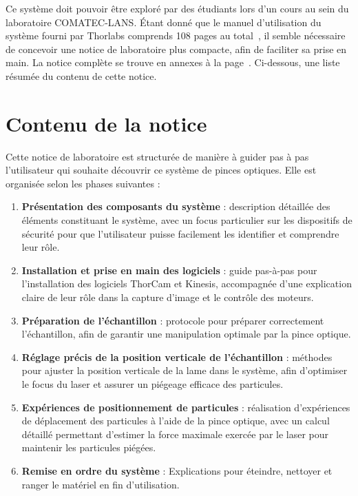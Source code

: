 Ce système doit pouvoir être exploré par des étudiants lors d'un cours au sein du laboratoire COMATEC-LANS. Étant donné que le manuel d'utilisation du système fourni par Thorlabs comprends 108 pages au total~\cite{manualPortableOpticalTweezers}, il semble nécessaire de concevoir une notice de laboratoire plus compacte, afin de faciliter sa prise en main. La notice complète se trouve en annexes à la page~\pageref{annexe:notice_labo}. Ci-dessous, une liste résumée du contenu de cette notice.
\section{Contenu de la notice}
Cette notice de laboratoire est structurée de manière à guider pas à pas l'utilisateur qui souhaite découvrir ce système de pinces optiques. Elle est organisée selon les phases suivantes :

\begin{enumerate}
    \item \textbf{Présentation des composants du système} : description détaillée des éléments constituant le système, avec un focus particulier sur les dispositifs de sécurité pour que l'utilisateur puisse facilement les identifier et comprendre leur rôle.

    \item \textbf{Installation et prise en main des logiciels} : guide pas-à-pas pour l'installation des logiciels ThorCam et Kinesis, accompagnée d'une explication claire de leur rôle dans la capture d'image et le contrôle des moteurs.

    \item \textbf{Préparation de l'échantillon} : protocole pour préparer correctement l'échantillon, afin de garantir une manipulation optimale par la pince optique.

    \item \textbf{Réglage précis de la position verticale de l'échantillon} : méthodes pour ajuster la position verticale de la lame dans le système, afin d'optimiser le focus du laser et assurer un piégeage efficace des particules.

    \item \textbf{Expériences de positionnement de particules} : réalisation d'expériences de déplacement des particules à l'aide de la pince optique, avec un calcul détaillé permettant d'estimer la force maximale exercée par le laser pour maintenir les particules piégées.

    \item \textbf{Remise en ordre du système} : Explications pour éteindre, nettoyer et ranger le matériel en fin d'utilisation.
\end{enumerate}